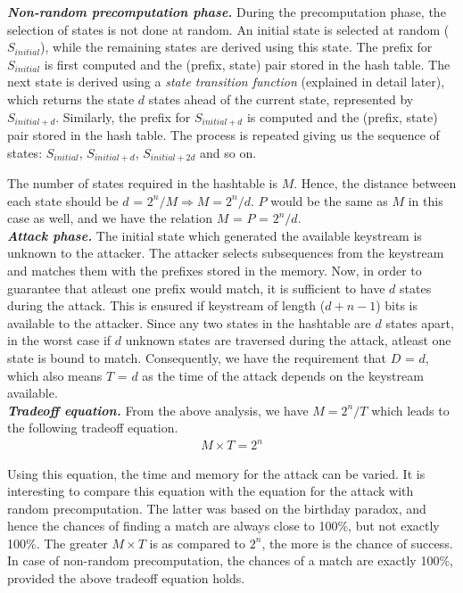 \noindent \textit{\textbf{Non-random precomputation phase.}} During the precomputation phase, the selection of states is not done at random. An initial state is selected at random ($S_{initial}$), while the remaining states are derived using this state. The prefix for $S_{initial}$ is first computed and the (prefix, state) pair stored in the hash table. The next state is derived using a \emph{state transition function} (explained in detail later), which returns the state $d$ states ahead of the current state, represented by $S_{initial+d}$. Similarly, the prefix for $S_{initial+d}$ is computed and the (prefix, state) pair stored in the hash table. The process is repeated giving us the sequence of states: $S_{initial}$, $S_{initial+d}$, $S_{initial+2d}$ and so on. 

The number of states required in the hashtable is $M$. Hence, the distance between each state should be $d$ = $2^n/M \Rightarrow M = 2^n/d$. $P$ would be the same as $M$ in this case as well, and we have the relation $M$ = $P$ = $2^n/d$.\\

\noindent \textit{\textbf{Attack phase.}} The initial state which generated the available keystream is unknown to the attacker. The attacker selects subsequences from the keystream and matches them with the prefixes stored in the memory. Now, in order to guarantee that atleast one prefix would match, it is sufficient to have $d$ states during the attack. This is ensured if keystream of length ($d + n - 1$) bits is available to the attacker. Since any two states in the hashtable are $d$ states apart, in the worst case if $d$ unknown states are traversed during the attack, atleast one state is bound to match. Consequently, we have the requirement that $D$ = $d$, which also means $T$ = $d$ as the time of the attack depends on the keystream available.\\

\noindent \textit{\textbf{Tradeoff equation.}} From the above analysis, we have $M = 2^n/T$ which leads to the following tradeoff equation.
\begin{align}
\label{eq:tmto-non-random} M \times T = 2^n
\end{align}

Using this equation, the time and memory for the attack can be varied. It is interesting to compare this equation with the equation for the attack with random precomputation. The latter was based on the birthday paradox, and hence the chances of finding a match are always close to 100\%, but not exactly 100\%. The greater $M \times T$ is as compared to $2^n$, the more is the chance of success. In case of non-random precomputation, the chances of a match are exactly 100\%, provided the above tradeoff equation holds.\\

